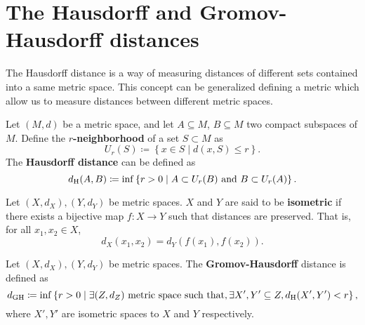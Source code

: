 \section{The Hausdorff and Gromov-Hausdorff distances} \label{sec:preliminaries-hausdorff}

The Hausdorff distance is a way of measuring distances of different sets contained into a same metric space. This concept can be generalized defining a metric which allow us to measure distances between different metric spaces.

\begin{definition}
    Let $ (M, d) $ be a metric space, and let $ A \subseteq M $, $ B \subseteq M $ two compact subspaces of $ M $. Define the {\bf $r$-neighborhood} of a set $ S \subset M $ as
    $$
        U_r(S) \coloneq \left\{ x \in S \mid d(x, S) \leq r \right\}.
    $$
    The {\bf Hausdorff distance} can be defined as
    $$
        d_{\operatorname{H}}(A, B) \coloneq \inf \left\{ r > 0 \mid A \subset U_r(B) \text{ and } B \subset U_r(A) \right\}.
    $$
\end{definition}

\begin{definition}
    Let $ (X, d_X), (Y, d_Y) $ be metric spaces. $ X $ and $ Y $ are said to be {\bf isometric} if there exists a bijective map $ f: X \to Y $ such that distances are preserved. That is, for all $ x_1, x_2 \in X $,
    $$
        d_X(x_1, x_2) = d_Y(f(x_1), f(x_2)).
    $$
\end{definition}

\begin{definition} \label{def:dgh}
    Let $ (X, d_X), (Y, d_Y) $ be metric spaces. The {\bf Gromov-Hausdorff} distance is defined as
    \begin{equation}
        d_{\operatorname{GH}} \coloneq \inf \left\{ r > 0 \mid \exists (Z, d_Z) \text{ metric space such that}, \exists X', Y' \subseteq Z, d_{\operatorname{H}}(X', Y') < r \right\},
    \end{equation}
    where $ X', Y' $ are isometric spaces to $ X $ and $ Y $ respectively.
\end{definition}


